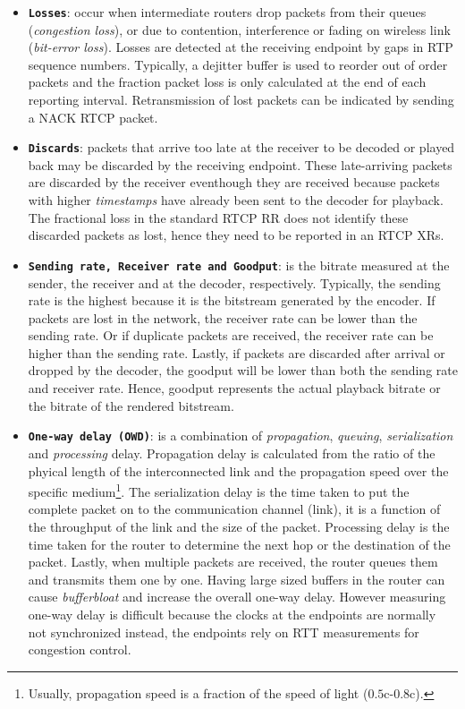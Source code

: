 \begin{itemize}

\item \textbf{\texttt{Losses}}: occur when intermediate routers drop packets
from their queues (\emph{congestion loss}), or due to contention, interference
or fading on wireless link (\emph {bit-error loss}). Losses are detected at
the receiving endpoint by gaps in RTP sequence numbers. Typically, a dejitter
buffer is used to reorder out of order packets and the fraction packet loss is
only calculated at the end of each reporting interval. Retransmission of lost
packets can be indicated by sending a NACK RTCP packet.

\item \textbf{\texttt{Discards}}: packets that arrive too late at the receiver
to be decoded or played back may be discarded by the receiving endpoint. These
late-arriving packets are discarded by the receiver eventhough they are
received because packets with higher \textit{timestamps} have already been
sent to the decoder for playback. The fractional loss in the standard RTCP RR
does not identify these discarded packets as lost, hence they need to be
reported in an RTCP XRs.

\item \textbf{\texttt{Sending rate, Receiver rate and Goodput}}: is the
bitrate measured at the sender, the receiver and at the decoder, respectively.
Typically, the sending rate is the highest because it is the bitstream
generated by the encoder. If packets are lost in the network, the receiver
rate can be lower than the sending rate. Or if duplicate packets are received,
the receiver rate can be higher than the sending rate. Lastly, if packets are
discarded after arrival or dropped by the decoder, the goodput will be lower
than both the sending rate and receiver rate. Hence, goodput represents the
actual playback bitrate or the bitrate of the rendered bitstream.

\item \textbf{\texttt{One-way delay (OWD)}}: is a combination of
\emph{propagation}, \emph{queuing}, \emph{serialization} and \emph{processing}
delay. Propagation delay is calculated from the ratio of the phyical length of
the interconnected link and the propagation speed over the specific
medium\footnote{Usually, propagation speed is a fraction of the speed of light
($0.5$c-$0.8$c).}. The serialization delay is the time taken to put the
complete packet on to the communication channel (link), it is a function of
the throughput of the link and the size of the packet. Processing delay is the
time taken for the router to determine the next hop or the destination of the
packet. Lastly, when multiple packets are received, the router queues them and
transmits them one by one. Having large sized buffers in the router can cause
\emph{bufferbloat} and increase the overall one-way delay. However measuring
one-way delay is difficult because the clocks at the endpoints are normally
not synchronized instead, the endpoints rely on RTT measurements for
congestion control.


\end{itemize}
